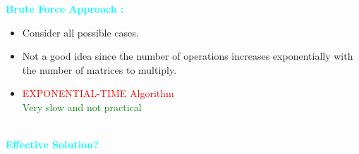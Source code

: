 \documentclass[algorithm,pgfplots]{cuzbeamer}
\begin{document}
    \begin{frame}
    \begin{block}{\large{\textcolor{cyan}{\textbf{Brute Force Approach :}}}}
    \\
      \vspace{0.75cm}
        
        \begin{itemize}
            \item {}
        Consider all possible cases. \\
        \item {}
        Not a good idea since the number of operations increases exponentially with the number of matrices to multiply. \\
        \item {} \textcolor{red}{EXPONENTIAL-TIME Algorithm} \\
        \textcolor{green}{Very slow and not practical} \\
        \end{itemize}  
    \end{block}
    \end{frame}
    
    \begin{frame}
    \\
    \vspace{1cm}
    \Large \textcolor{cyan}{\textbf{Effective Solution?}}
    
        
    \end{frame}
\end{document}
